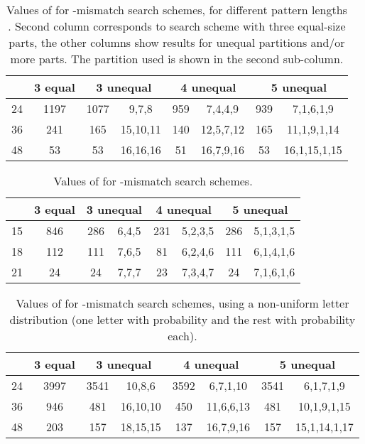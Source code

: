 \documentclass[12pt]{article}
\begin{document}
\begin{table}[!tb]
\caption{Values of  for -mismatch
search schemes, for different pattern lengths . 
Second column corresponds to 
search scheme  with three equal-size parts, 
the other columns show results for unequal partitions and/or more
parts. The partition used is shown in the second sub-column. 
\label{tab:sigma4}}
\centering
\begin{tabular}{|c|c|c|c|c|c|c|c|}
\hline
 & 3 equal & \multicolumn{2}{|c|}{3 unequal} &
\multicolumn{2}{|c|}{4 unequal} & \multicolumn{2}{|c|}{5 unequal} \\
\hline
24 & 1197 &  1077 & 9,7,8    &  959 & 7,4,4,9   &  939 & 7,1,6,1,9 \\
36 &  241 &   165 & 15,10,11 &  140 & 12,5,7,12 &  165 & 11,1,9,1,14 \\
48 &   53 &    53 & 16,16,16 &   51 & 16,7,9,16 &   53 & 16,1,15,1,15 \\
\hline
\end{tabular}
\end{table}
\begin{table}[!tb]
\caption{Values of  for -mismatch
search schemes.\label{tab:sigma30}}
\centering
\begin{tabular}{|c|c|c|c|c|c|c|c|}
\hline
 & 3 equal & \multicolumn{2}{|c|}{3 unequal} &
\multicolumn{2}{|c|}{4 unequal} & \multicolumn{2}{|c|}{5 unequal} \\
\hline
15 &  846 &  286 & 6,4,5 &  231 & 5,2,3,5 &  286 & 5,1,3,1,5 \\
18 &  112 &  111 & 7,6,5 &   81 & 6,2,4,6 &  111 & 6,1,4,1,6 \\
21 &   24 &   24 & 7,7,7 &   23 & 7,3,4,7 &   24 & 7,1,6,1,6 \\
\hline
\end{tabular}
\end{table}
\begin{table}[!tb]
\caption{Values of  for -mismatch
search schemes, using a non-uniform letter distribution (one letter with
probability  and the rest with probability 
each).\label{tab:nonuniform}}
\centering
\begin{tabular}{|c|c|c|c|c|c|c|c|}
\hline
 & 3 equal & \multicolumn{2}{|c|}{3 unequal} &
\multicolumn{2}{|c|}{4 unequal} & \multicolumn{2}{|c|}{5 unequal} \\
\hline
24 & 3997 &  3541 & 10,8,6   & 3592 & 6,7,1,10  & 3541 & 6,1,7,1,9 \\
36 &  946 &   481 & 16,10,10 &  450 & 11,6,6,13 &  481 & 10,1,9,1,15 \\
48 &  203 &   157 & 18,15,15 &  137 & 16,7,9,16 &  157 & 15,1,14,1,17\\
\hline
\end{tabular}
\end{table}
\end{document}
